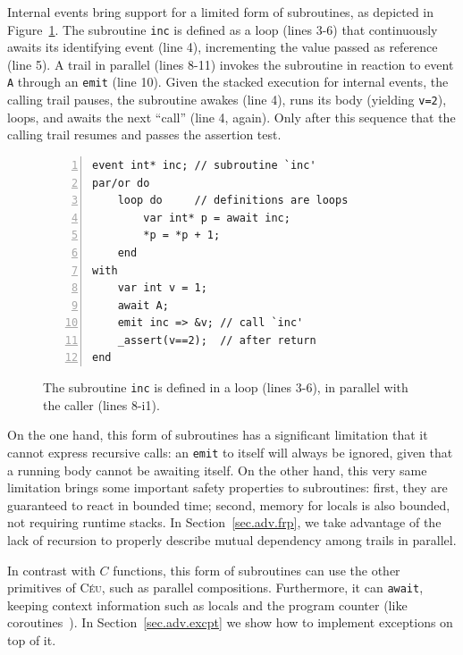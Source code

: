\documentclass{acm_proc_article-sp}
\newcommand{\CEU}{\textsc{C\'{e}u}\xspace}
\newcommand{\code}[1] {{\small{\texttt{#1}}}}
\newcommand{\1}{\;}
\newcommand{\2}{\;\;}
\newcommand{\3}{\;\;\;}
\newcommand{\5}{\;\;\;\;\;}
\begin{document}
Internal events bring support for a limited form of subroutines, as depicted in 
Figure~\ref{lst.sub}.
The subroutine \code{inc} is defined as a loop (lines 3-6) that continuously 
awaits its identifying event (line 4), incrementing the value passed as 
reference (line 5).
A trail in parallel (lines 8-11) invokes the subroutine in reaction to event 
\code{A} through an \code{emit} (line 10).
Given the stacked execution for internal events, the calling trail pauses, the 
subroutine awakes (line 4), runs its body (yielding \code{v=2}), loops, and 
awaits the next ``call'' (line 4, again).
Only after this sequence that the calling trail resumes and passes the 
assertion test.
 
\begin{figure}
\begin{lstlisting}[numbers=left,xleftmargin=2em]
event int* inc; // subroutine `inc'
par/or do
    loop do     // definitions are loops
        var int* p = await inc;
        *p = *p + 1;
    end
with
    var int v = 1;
    await A;
    emit inc => &v; // call `inc'
    _assert(v==2);  // after return
end
\end{lstlisting}
\caption{ The subroutine \code{inc} is defined in a loop (lines 3-6), in 
parallel with the caller (lines 8-i1).
\label{lst.sub}
}
\end{figure}

On the one hand, this form of subroutines has a significant limitation that it 
cannot express recursive calls: an \code{emit} to itself will always be 
ignored, given that a running body cannot be awaiting itself.
%
On the other hand, this very same limitation brings some important safety 
properties to subroutines:
first, they are guaranteed to react in bounded time;
second, memory for locals is also bounded, not requiring runtime stacks.
%
In Section~\ref{sec.adv.frp}, we take advantage of the lack of recursion to 
properly describe mutual dependency among trails in parallel.

In contrast with $C$ functions, this form of subroutines can use the other 
primitives of \CEU, such as parallel compositions.
Furthermore, it can \code{await}, keeping context information such as locals 
and the program counter (like coroutines~\cite{lua.coroutines}).
In Section~\ref{sec.adv.excpt} we show how to implement exceptions on top of 
it.
\end{document}
